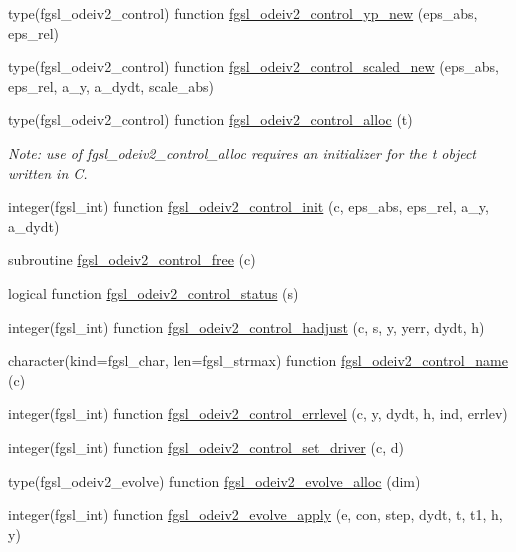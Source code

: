 \begin{DoxyCompactItemize}
\item 
type(fgsl\+\_\+odeiv2\+\_\+control) function \hyperlink{ode_8finc_afd262d0ea5bb3c0a5ed79264eaec7b52}{fgsl\+\_\+odeiv2\+\_\+control\+\_\+yp\+\_\+new} (eps\+\_\+abs, eps\+\_\+rel)
\item 
type(fgsl\+\_\+odeiv2\+\_\+control) function \hyperlink{ode_8finc_ac9023732522b7adc92a721faac704a21}{fgsl\+\_\+odeiv2\+\_\+control\+\_\+scaled\+\_\+new} (eps\+\_\+abs, eps\+\_\+rel, a\+\_\+y, a\+\_\+dydt, scale\+\_\+abs)
\item 
type(fgsl\+\_\+odeiv2\+\_\+control) function \hyperlink{ode_8finc_aa2838bdd478399790455f495923c2a2d}{fgsl\+\_\+odeiv2\+\_\+control\+\_\+alloc} (t)
\begin{DoxyCompactList}\small\item\em Note\+: use of fgsl\+\_\+odeiv2\+\_\+control\+\_\+alloc requires an initializer for the t object written in C. \end{DoxyCompactList}\item 
integer(fgsl\+\_\+int) function \hyperlink{ode_8finc_a4b0b791a775a86ef0f1f74cc68abcc68}{fgsl\+\_\+odeiv2\+\_\+control\+\_\+init} (c, eps\+\_\+abs, eps\+\_\+rel, a\+\_\+y, a\+\_\+dydt)
\item 
subroutine \hyperlink{ode_8finc_aadeb0256bb6a39f1d946c355ac6b2afa}{fgsl\+\_\+odeiv2\+\_\+control\+\_\+free} (c)
\item 
logical function \hyperlink{ode_8finc_af5fcca7af27c62493f685900fe29f999}{fgsl\+\_\+odeiv2\+\_\+control\+\_\+status} (s)
\item 
integer(fgsl\+\_\+int) function \hyperlink{ode_8finc_a3ac22f04f9490100937304830d161b1a}{fgsl\+\_\+odeiv2\+\_\+control\+\_\+hadjust} (c, s, y, yerr, dydt, h)
\item 
character(kind=fgsl\+\_\+char, len=fgsl\+\_\+strmax) function \hyperlink{ode_8finc_ac9512303eeabe05335d9fbada1c5f841}{fgsl\+\_\+odeiv2\+\_\+control\+\_\+name} (c)
\item 
integer(fgsl\+\_\+int) function \hyperlink{ode_8finc_ad529291d0d2c826dec9976f5a24af8b1}{fgsl\+\_\+odeiv2\+\_\+control\+\_\+errlevel} (c, y, dydt, h, ind, errlev)
\item 
integer(fgsl\+\_\+int) function \hyperlink{ode_8finc_a53f1174dfc4a844b55c3654b4ac94c82}{fgsl\+\_\+odeiv2\+\_\+control\+\_\+set\+\_\+driver} (c, d)
\item 
type(fgsl\+\_\+odeiv2\+\_\+evolve) function \hyperlink{ode_8finc_a010ce00112539875b18c9741e3beaa6e}{fgsl\+\_\+odeiv2\+\_\+evolve\+\_\+alloc} (dim)
\item 
integer(fgsl\+\_\+int) function \hyperlink{ode_8finc_a2eebbf858365bd4853b5ddd0a1071d48}{fgsl\+\_\+odeiv2\+\_\+evolve\+\_\+apply} (e, con, step, dydt, t, t1, h, y)

\end{DoxyCompactItemize}
